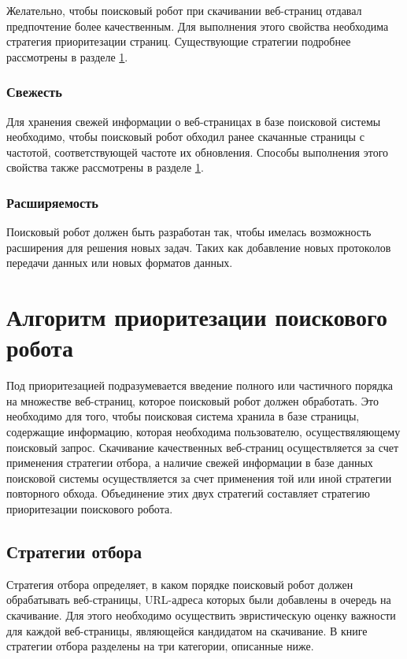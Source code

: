 Желательно, чтобы поисковый робот при скачивании веб-страниц отдавал предпочтение более качественным. Для выполнения этого свойства необходима стратегия приоритезации страниц. Существующие стратегии подробнее рассмотрены в разделе \ref{algorithms}.

\subsubsection*{Свежесть}

Для хранения свежей информации о веб-страницах в базе поисковой системы необходимо, чтобы поисковый робот обходил ранее скачанные страницы с частотой, соответствующей частоте их обновления. Способы выполнения этого свойства также рассмотрены в разделе \ref{algorithms}.

\subsubsection*{Расширяемость}

Поисковый робот должен быть разработан так, чтобы имелась возможность расширения для решения новых задач. Таких как добавление новых протоколов передачи данных или новых форматов данных. 

\section{Алгоритм приоритезации поискового робота}
\label{algorithms}

Под приоритезацией подразумевается введение полного или частичного порядка на множестве веб-страниц, которое поисковый робот должен обработать. Это необходимо для того, чтобы поисковая система хранила в базе страницы, содержащие информацию, которая необходима пользователю, осуществяляющему поисковый запрос. Скачивание качественных веб-страниц осуществляется за счет применения стратегии отбора, а наличие свежей информации в базе данных поисковой системы осуществляется за счет применения той или иной стратегии повторного обхода. Объединение этих двух стратегий составляет стратегию приоритезации поискового робота. 

\subsection{Стратегии отбора}
\label{selection_strategy}

Стратегия отбора определяет, в каком порядке поисковый робот должен обрабатывать веб-страницы, URL-адреса которых были добавлены в очередь на скачивание. Для этого необходимо осуществить эвристическую оценку важности для каждой веб-страницы, являющейся кандидатом на скачивание. В книге \cite{Castillo} стратегии отбора разделены на три категории, описанные ниже.

